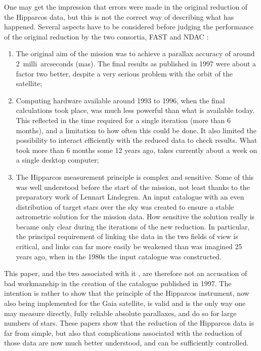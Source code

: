 \documentclass{aa}
\begin{document}
One may get the impression that errors were made in the original reduction
of the Hipparcos data, but this is not the correct way of describing what 
has happened. Several aspects have to be considered before judging the 
performance of the original reduction by the two consortia, 
FAST \citep{koval92} and NDAC \citep{lindeg92}:
\begin{enumerate}
\item The original aim of the mission was to achieve a parallax accuracy 
of around 2~milli~arcseconds (mas). The final results as published in 1997 were
about a factor two better, despite a very serious problem with the orbit
of the satellite;
\item Computing hardware available around 1993 to 1996, when the final 
calculations took place, was much less powerful than what is available today.
This reflected in the time required for a single iteration
(more than 6 months), and a limitation to how often this could be done. It also
limited the possibility to interact efficiently with the reduced data to
check results. What took more than 6 months some 12 years ago, takes currently
about a week on a single desktop computer;
\item The Hipparcos measurement principle is complex and sensitive. Some of
this was well understood before the start of the mission, not least thanks
to the preparatory work of Lennart Lindegren. An input catalogue 
\citep{turon92} with an even distribution of target stars over the sky 
was created to ensure a stable astrometric solution for the mission data. 
How sensitive the solution really is became only clear during the iterations
of the new reduction. In particular, the principal requirement of linking the 
data in the two fields of view is critical, and links can far more easily be 
weakened than was imagined 25 years ago, when in the 1980s the input 
catalogue was constructed.
\end{enumerate}
This paper, and the two associated with it \citep{fvl05a,fvl05b}, are 
therefore not an accusation of bad workmanship in the creation of the 
catalogue published in 1997. The intention is rather to show that the 
principle of the Hipparcos instrument, now also being implemented for the 
Gaia satellite, is valid and is the only way one may measure directly, 
fully reliable absolute parallaxes, and do so for large numbers of stars. 
These papers show that the reduction of the Hipparcos data is far from 
simple, but also that complications associated with the reduction of those 
data are now much better understood, and can be sufficiently controlled.
\end{document}
